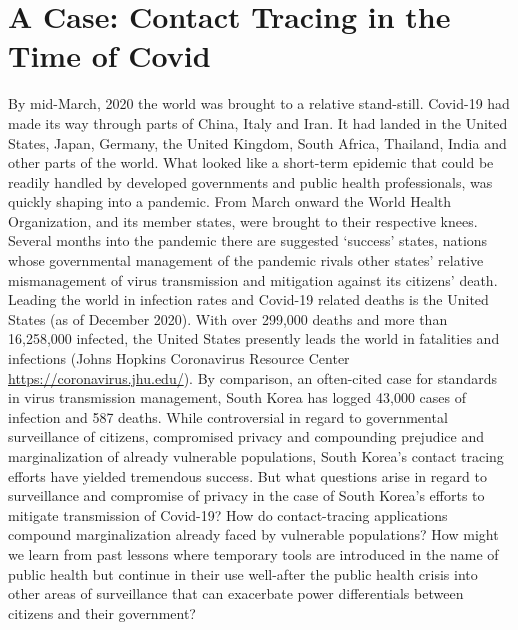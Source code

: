\documentclass[11pt,dvipdfm]{article}
\begin{document}
\section{A Case:  Contact Tracing in the Time of Covid}

By mid-March, 2020 the world was brought to a relative stand-still.  Covid-19 had made its way through parts of China, Italy and Iran.  It had landed in the United States, Japan, Germany, the United Kingdom, South Africa, Thailand, India and other parts of the world.  What looked like a short-term epidemic that could be readily handled by developed governments and public health professionals, was quickly shaping into a pandemic.  From March onward the World Health Organization, and its member states, were brought to their respective knees.  Several months into the pandemic there are suggested ‘success’ states, nations whose governmental management of the pandemic rivals other states’ relative mismanagement of virus transmission and mitigation against its citizens’ death.  Leading the world in infection rates and Covid-19 related deaths is the United States (as of December 2020).  With over 299,000 deaths and more than 16,258,000 infected, the United States presently leads the world in fatalities and infections (Johns Hopkins Coronavirus Resource Center \url{https://coronavirus.jhu.edu/}).  By comparison, an often-cited case for standards in virus transmission management, South Korea has logged 43,000 cases of infection and 587 deaths.  While controversial in regard to governmental surveillance of citizens, compromised privacy and compounding prejudice and marginalization of already vulnerable populations, South Korea’s contact tracing efforts have yielded tremendous success.  But what questions arise in regard to surveillance and compromise of privacy in the case of South Korea’s efforts to mitigate transmission of Covid-19?  How do contact-tracing applications compound marginalization already faced by vulnerable populations?  How might we learn from past lessons where temporary tools are introduced in the name of public health but continue in their use well-after the public health crisis into other areas of surveillance that can exacerbate power differentials between citizens and their government?
\end{document}
